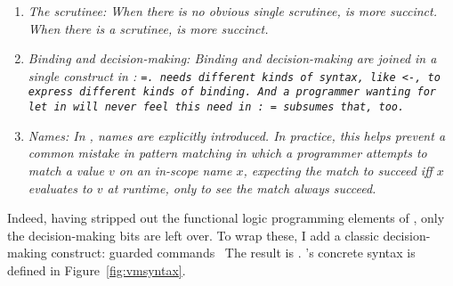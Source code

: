 \documentclass[manuscript,screen,review, 12pt, nonacm]{acmart}
\begin{document}
\begin{enumerate}
  \item \it{The scrutinee:} When there is no obvious single scrutinee, \VMinus is more succinct.
  When there is a scrutinee, \PPlus is more succinct. 
  \item \it{Binding and decision-making:} Binding and decision-making are
  joined in a single construct in \VMinus: \tt{=}. \PPlus needs different
  kinds of syntax, like \tt{<-}, to express different kinds of binding. And
  a programmer wanting for \tt{let} in \PPlus will never feel this need in
  \VMinus: \tt{=} subsumes that, too. 
  \item \it{Names:} In \VMinus, names are explicitly introduced. In
  practice, this helps prevent a common mistake in pattern matching in which
  a programmer attempts to match a value $v$ on an in-scope name $x$,
  expecting the match to succeed iff $x$ evaluates to $v$ at runtime, only
  to see the match always succeed. 
\end{enumerate}     










Indeed, having stripped out the functional logic programming elements of
\VC, only the decision-making bits are left over. To wrap these, I add a
classic decision-making construct: guarded commands~\citep{dijkstra} The result is \VMinus. \VMinus's concrete syntax is
defined in Figure~\ref{fig:vmsyntax}. 
\end{document}
